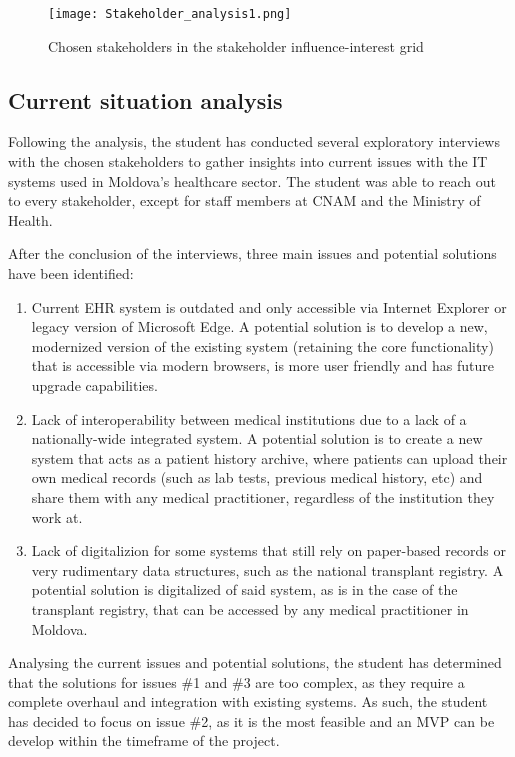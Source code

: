 \begin{figure}[ht]
    \centering
    \texttt{[image: Stakeholder\_analysis1.png]}
    \caption{Chosen stakeholders in the stakeholder influence-interest grid}\label{fig:stakeholder_analysis1}
\end{figure}

\subsection{Current situation analysis}

Following the analysis, the student has conducted several exploratory interviews with the chosen stakeholders to gather insights into current issues with the IT systems used in Moldova's healthcare sector. The student was able to reach out to every stakeholder, except for staff members at CNAM and the Ministry of Health. 

After the conclusion of the interviews, three main issues and potential solutions have been identified:

\begin{enumerate}
    \item Current EHR system is outdated and only accessible via Internet Explorer or legacy version of Microsoft Edge. A potential solution is to develop a new, modernized version of the existing system (retaining the core functionality) that is accessible via modern browsers, is more user friendly and has future upgrade capabilities.
    \item Lack of interoperability between medical institutions due to a lack of a nationally-wide integrated system. A potential solution is to create a new system that acts as a patient history archive, where patients can upload their own medical records (such as lab tests, previous medical history, etc) and share them with any medical practitioner, regardless of the institution they work at. 
    \item Lack of digitalizion for some systems that still rely on paper-based records or very rudimentary data structures, such as the national transplant registry. A potential solution is digitalized of said system, as is in the case of the transplant registry, that can be accessed by any medical practitioner in Moldova.
\end{enumerate}

Analysing the current issues and potential solutions, the student has determined that the solutions for issues \#1 and \#3 are too complex, as they require a complete overhaul and integration with existing systems. As such, the student has decided to focus on issue \#2, as it is the most feasible and an MVP can be develop within the timeframe of the project. 

